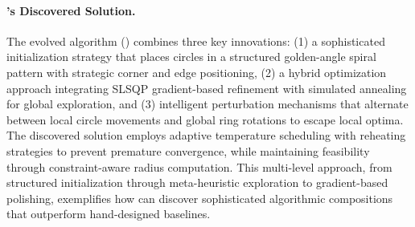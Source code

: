 \paragraph{\ouralgo's Discovered Solution.} The evolved algorithm () combines three key innovations: (1) a sophisticated initialization strategy that places circles in a structured golden-angle spiral pattern with strategic corner and edge positioning, (2) a hybrid optimization approach integrating SLSQP gradient-based refinement with simulated annealing for global exploration, and (3) intelligent perturbation mechanisms that alternate between local circle movements and global ring rotations to escape local optima. The discovered solution employs adaptive temperature scheduling with reheating strategies to prevent premature convergence, while maintaining feasibility through constraint-aware radius computation. This multi-level approach, from structured initialization through meta-heuristic exploration to gradient-based polishing, exemplifies how \ouralgo can discover sophisticated algorithmic compositions that outperform hand-designed baselines.